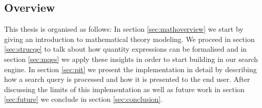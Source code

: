 
\subsection{Overview}

This thesis is organised as follows: In section \ref{sec:mathoverview} we start by giving an introduction to mathematical theory modeling. We proceed in section \ref{sec:strucqe} to talk about how quantity expressions can be formalised and in section \ref{sec:mqes} we apply these insights in order to start building in our search engine. In section \ref{sec:pit} we present the implementation in detail by describing how a search query is processed and how it is presented to the end user. After discussing the limits of this implementation as well as future work in section \ref{sec:future} we conclude in section \ref{sec:conclusion}.
